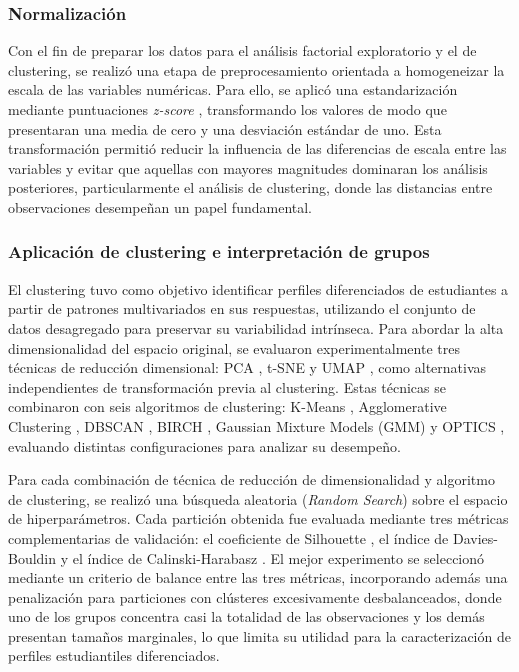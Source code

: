 \documentclass[conference]{IEEEtran}
\begin{document}
\subsubsection{Normalización}
Con el fin de preparar los datos para el análisis factorial exploratorio y el de clustering, se realizó una etapa de preprocesamiento orientada a homogeneizar la escala de las variables numéricas. Para ello, se aplicó una estandarización mediante puntuaciones \textit{z-score} \cite{illowsky2013introductory}, transformando los valores de modo que presentaran una media de cero y una desviación estándar de uno. Esta transformación permitió reducir la influencia de las diferencias de escala entre las variables y evitar que aquellas con mayores magnitudes dominaran los análisis posteriores, particularmente el análisis de clustering, donde las distancias entre observaciones desempeñan un papel fundamental.

\subsubsection{Aplicación de clustering e interpretación de grupos}

El clustering tuvo como objetivo identificar perfiles diferenciados de estudiantes a partir de patrones multivariados en sus respuestas, utilizando el conjunto de datos desagregado para preservar su variabilidad intrínseca. Para abordar la alta dimensionalidad del espacio original, se evaluaron experimentalmente tres técnicas de reducción dimensional: PCA \cite{noauthor_analysis_nodate}, t-SNE \cite{maaten_visualizing_2008} y UMAP \cite{mcinnes_umap_2020}, como alternativas independientes de transformación previa al clustering. Estas técnicas se combinaron con seis algoritmos de clustering: K-Means \cite{macqueen_methods_1967}, Agglomerative Clustering \cite{noauthor_hierarchical_nodate}, DBSCAN \cite{ester_density-based_1996}, BIRCH \cite{zhang_birch_1996}, Gaussian Mixture Models (GMM) \cite{noauthor_maximum_nodate} y OPTICS \cite{ankerst_optics_1999}, evaluando distintas configuraciones para analizar su desempeño.

Para cada combinación de técnica de reducción de dimensionalidad y algoritmo de clustering, se realizó una búsqueda aleatoria (\textit{Random Search}) sobre el espacio de hiperparámetros. Cada partición obtenida fue evaluada mediante tres métricas complementarias de validación: el coeficiente de Silhouette \cite{rousseeuw_silhouettes_1987}, el índice de Davies-Bouldin \cite{noauthor_cluster_nodate} y el índice de Calinski-Harabasz \cite{calinski_dendrite_1974}. El mejor experimento se seleccionó mediante un criterio de balance entre las tres métricas, incorporando además una penalización para particiones con clústeres excesivamente desbalanceados, donde uno de los grupos concentra casi la totalidad de las observaciones y los demás presentan tamaños marginales, lo que limita su utilidad para la caracterización de perfiles estudiantiles diferenciados.
\end{document}
